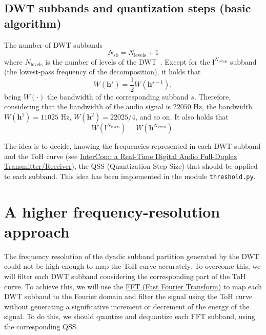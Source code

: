 \subsection{DWT subbands and quantization steps (basic algorithm)}
The number of DWT subbands
\begin{equation}
  N_{\text{sb}} = N_{\text{levels}} + 1
\end{equation}
where $N_{\text{levels}}$ is the number of levels of the
DWT~\cite{vetterli1995wavelets}. Except for the
${\mathbf l}^{N_{\text{levels}}}$ subband (the lowest-pass frequency
of the decomposition), it holds that
\begin{equation}
  W({\mathbf h}^s) = \frac{1}{2}W({\mathbf h}^{s-1}),
\end{equation}
being $W(\cdot)$ the bandwidth of the corresponding subband
$s$. Therefore, considering that the bandwidth of the audio signal is
$22050$ Hz, the bandwidth $W({\mathbf h}^1)=11025$ Hz,
$W({\mathbf h} ^2)=22025/4$, and so on. It also holds that
\begin{equation}
  W({\mathbf l}^{N_{\text{levels}}}) = W({\mathbf h}^{N_{\text{levels}}}).
\end{equation}

The idea is to decide, knowing the frequencies represented in each DWT
subband and the ToH curve (see
\href{https://github.com/Tecnologias-multimedia/InterCom/blob/master/docs/2-hours_seminar.ipynb}{
  InterCom: a Real-Time Digital Audio Full-Duplex
  Transmitter/Receiver}), the QSS (Quantization Step Size) that should
be applied to each subband. This idea has been implemented in the
module \verb|threshold.py|.

\section{A higher frequency-resolution approach}
\label{sec:FFT}

The frequency resolution of the dyadic subband partition generated by
the DWT could not be high enough to map the ToH curve accurately. To
overcome this, we will filter each DWT subband considering the
corresponding part of the ToH curve. To achieve this, we will use the
\href{https://numpy.org/doc/stable/reference/routines.fft.html}{FFT
  (Fast Fourier Transform)} to map each DWT subband to the Fourier
domain and filter the signal using the ToH curve without generating a
significative increment or decrement of the energy of the signal. To
do this, we should quantize and dequantize each FFT subband, using the
corresponding QSS.

